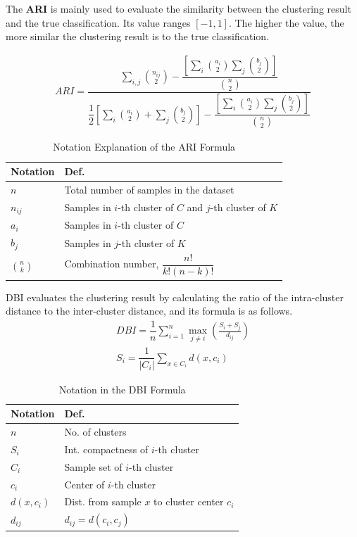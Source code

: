 \documentclass[conference]{IEEEtran}
\begin{document}
The \textbf{ARI} is mainly used to evaluate the similarity between the clustering result and the true classification. Its value ranges $[-1,1]$. The higher the value, the more similar the clustering result is to the true classification. 

\begin{align}
    ARI=\dfrac{\sum_{i,j}\binom{n_{ij}}{2}-\dfrac{\left[\sum_{i}\binom{a_{i}}{2}\sum_{j}\binom{b_{j}}{2}\right]}{\binom{n}{2}}}{\dfrac{1}{2}\left[\sum_{i}\binom{a_{i}}{2}+\sum_{j}\binom{b_{j}}{2}\right]-\dfrac{\left[\sum_{i}\binom{a_{i}}{2}\sum_{j}\binom{b_{j}}{2}\right]}{\binom{n}{2}}}
\end{align}
\begin{table}[h!]
    \centering
    \caption{Notation Explanation of the ARI Formula}
    \begin{tabular}{ll}
        \toprule
        \textbf{Notation} & \textbf{Def.} \\
        \midrule
        $n$ & Total number of samples in the dataset \\
        $n_{ij}$ & Samples in $i$-th cluster of $C$ and $j$-th cluster of $K$ \\
        $a_i$ & Samples in $i$-th cluster of $C$ \\
        $b_j$ & Samples in $j$-th cluster of $K$ \\
        $\binom{n}{k}$ & Combination number, $\dfrac{n!}{k!(n - k)!}$ \\
        \bottomrule
    \end{tabular}
\end{table}

DBI evaluates the clustering result by calculating the ratio of the intra-cluster distance to the inter-cluster distance, and its formula is as follows.
\begin{align}
    DBI=\dfrac{1}{n}\sum_{i = 1}^{n}\max_{j\neq i}\left(\frac{S_{i}+S_{j}}{d_{ij}}\right)\\
    S_i = \dfrac{1}{\vert C_i\vert}\sum_{x\in C_i}d(x,c_i) 
\end{align}

\begin{table}[h!]
    \centering
    \caption{Notation in the DBI Formula}
        \begin{tabular}{ll}
            \toprule
         \textbf{Notation} & \textbf{Def.} \\
            \midrule
            $n$ & No. of clusters \\
            $S_i$ & Int. compactness of $i$-th cluster\\
            $C_i$ & Sample set of $i$-th cluster \\
            $c_i$ & Center of $i$-th cluster \\
            $d(x,c_i)$ & Dist. from sample $x$ to cluster center $c_i$ \\
            $d_{ij}$ & $d_{ij}=d(c_i,c_j)$ \\
            \bottomrule
        \end{tabular}
\end{table}
\end{document}
